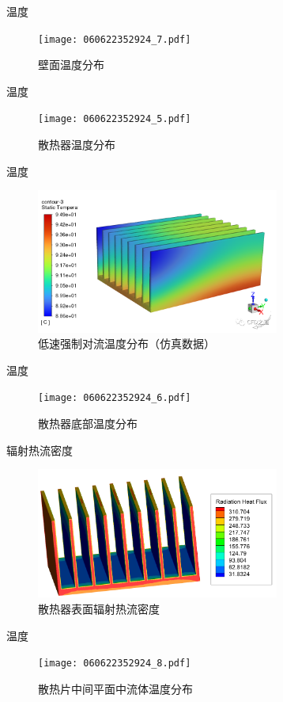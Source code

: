 \documentclass[UTF8,9pt]{ctexbeamer}
\begin{document}
\begin{frame}{温度}
	\begin{figure}
		\texttt{[image: 060622352924\_7.pdf]}
		\caption{壁面温度分布}
	\end{figure}
\end{frame}
\begin{frame}{温度}
	\begin{figure}
		\texttt{[image: 060622352924\_5.pdf]}
		\caption{散热器温度分布}
	\end{figure}	
\end{frame}
\begin{frame}{温度}
	\begin{figure}
		\includegraphics[width=8cm, trim={0 1cm 0 1cm}]{微信图片_20220606231543.png}
		\caption{低速强制对流温度分布（仿真数据）}
	\end{figure}
\end{frame}
\begin{frame}{温度}
	\begin{figure}
		\texttt{[image: 060622352924\_6.pdf]}
		\caption{散热器底部温度分布}
	\end{figure}
\end{frame}
\begin{frame}{辐射热流密度}
	\begin{figure}
		\includegraphics[width=8cm, trim={0 0cm 0 1cm}]{figure15.png}
		\caption{散热器表面辐射热流密度}
	\end{figure}
\end{frame}
\begin{frame}{温度}
	\begin{figure}
		\texttt{[image: 060622352924\_8.pdf]}
		\caption{散热片中间平面中流体温度分布}
	\end{figure}
\end{frame}
\end{document}
